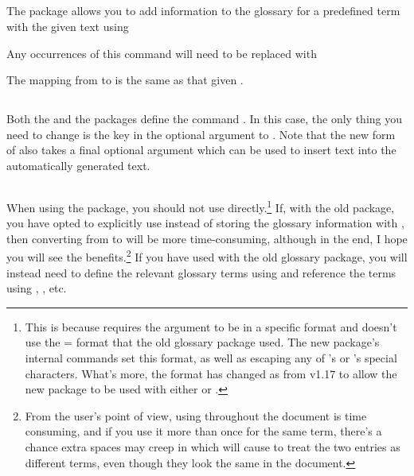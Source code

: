 \documentclass{nlctdoc}
\newenvironment{oldway}{%
  \begin{labelledbox}{\styfmt{glossary}}\ttfamily\obeylines
}{%
  \end{labelledbox}%
}
\newenvironment{newway}{%
  \begin{labelledbox}{\styfmt{glossaries}}\ttfamily\obeylines
}{%
  \end{labelledbox}%
}
\begin{document}
\subsection{\texorpdfstring{}{\textbackslash
useGlosentry}}

The  package allows you to add information to the
glossary for a predefined term with the given text using
\begin{oldway}
\end{oldway}%
Any occurrences of this command will need to be replaced with
\begin{newway}
\end{newway}%
The mapping from  to  is
the same as that given .

\subsection{\texorpdfstring{}{\textbackslash gls}}

Both the  and the  packages define
the command . In this case, the only thing you need to
change is the  key in the optional argument
to . Note that the new form of  also takes
a final optional argument which can be used to insert text into the
automatically generated text.

\subsection{\texorpdfstring{}{\textbackslash glossary}}
\label{sec:csglossary}

When using the  package, you should not use
 directly.\footnote{This is because 
requires the argument to be in a specific format and doesn't use the
= format that the old glossary package used.
The new package's internal commands set this format, as well as
escaping any of 's or 's special
characters. What's more, the format has changed as from v1.17 to
allow the new package to be used with either  or
.}  If, with the old package, you have opted to
explicitly use  instead of storing the glossary
information with , then converting from
 to  will be more time-consuming,
although in the end, I hope you will see the benefits.\footnote{From
the user's point of view, using  throughout the
document is time consuming, and if you use it more than once for the
same term, there's a chance extra spaces may creep in which will
cause  to treat the two entries as different
terms, even though they look the same in the document.}  If you have
used  with the old glossary package, you will instead
need to define the relevant glossary terms using
 and reference the terms using
, ,  etc.
\end{document}
